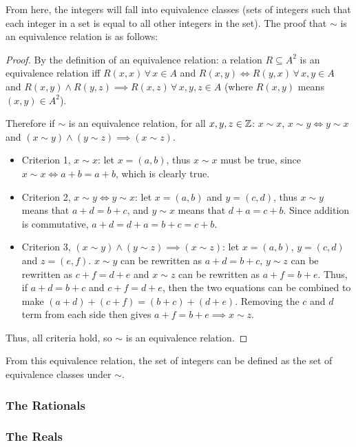             From here, the integers will fall into equivalence classes (sets of integers such that each integer in a set is equal to all other integers in the set).
            The proof that $\sim$ is an equivalence relation is as follows:
            \begin{proof}
                By the definition of an equivalence relation: a relation $R\subseteq A^2$ is an equivalence relation iff $R(x,x)\,\forall\,x\in A$ and $R(x,y)\iff R(y,x)\,\forall\,x,y\in A$ and $R(x,y)\wedge R(y,z)\implies R(x,z)\,\forall\,x,y,z\in A$ (where $R(x,y)$ means $(x,y)\in A^2$).

                Therefore if $\sim$ is an equivalence relation, for all $x,y,z\in\operatorname{\mathbb{Z}}$: $x\sim x$, $x\sim y\iff y\sim x$ and $(x\sim y)\wedge(y\sim z)\implies(x\sim z)$.
                \begin{itemize}
                    \item Criterion 1, $x\sim x$: let $x=(a,b)$, thus $x\sim x$ must be true, since $x\sim x\iff a+b=a+b$, which is clearly true.
                    \item Criterion 2, $x\sim y\iff y\sim x$: let $x=(a,b)$ and $y=(c,d)$, thus $x\sim y$ means that $a+d=b+c$, and $y\sim x$ means that $d+a=c+b$.
                    Since addition is commutative, $a+d=d+a=b+c=c+b$.
                    \item Criterion 3, $(x\sim y)\wedge(y\sim z)\implies(x\sim z)$: let $x=(a,b)$, $y=(c,d)$ and $z=(e,f)$.
                    $x\sim y$ can be rewritten as $a+d=b+c$, $y\sim z$ can be rewritten as $c+f=d+e$ and $x\sim z$ can be rewritten as $a+f=b+e$.
                    Thus, if $a+d=b+c$ and $c+f=d+e$, then the two equations can be combined to make $(a+d)+(c+f)=(b+c)+(d+e)$.
                    Removing the $c$ and $d$ term from each side then gives $a+f=b+e\implies x\sim z$.
                \end{itemize}
                Thus, all criteria hold, so $\sim$ is an equivalence relation.
            \end{proof}
            From this equivalence relation, the set of integers can be defined as the set of equivalence classes under $\sim$.

        \subsubsection{The Rationals}

        \subsubsection{The Reals}

